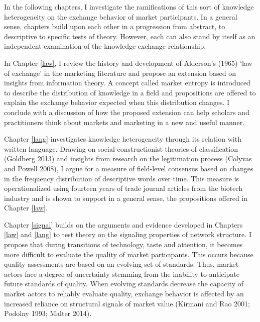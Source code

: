 In the following chapters, I investigate the ramifications of this sort of knowledge heterogeneity on the exchange behavior of market participants. In a general sense, chapters build upon each other in a progression from abstract, to descriptive to specific tests of theory. However, each can also stand by itself as an independent examination of the knowledge-exchange relationship. 

In Chapter \ref{law}, I review the history and development of Alderson's (1965) `law of exchange' in the marketing literature and propose an extension based on insights from information theory. A concept called market entropy is introduced to describe the distribution of knowledge in a field and propositions are offered to explain the exchange behavior expected when this distribution changes. I conclude with a discussion of how the proposed extension can help scholars and practitioners think about markets and marketing in a new and useful manner. 

Chapter \ref{lang} investigates knowledge heterogeneity through its relation with written language. Drawing on social-constructionist theories of classification (Goldberg 2013) and insights from research on the legitimation process (Colyvas and Powell 2008), I argue for a measure of field-level consensus based on changes in the frequency distribution of descriptive words over time. This measure is operationalized using fourteen years of trade journal articles from the biotech industry and is shown to support in a general sense, the propositions offered in Chapter \ref{law}. 

Chapter \ref{signal} builds on the arguments and evidence developed in Chapters \ref{law} and \ref{lang} to test theory on the signaling properties of network structure. I propose that during transitions of technology, taste and attention, it becomes more difficult to evaluate the quality of market participants. This occurs because quality assessments are based on an evolving set of standards. Thus, market actors face a degree of uncertainty stemming from the inability to anticipate future standards of quality. When evolving standards decrease the capacity of market actors to reliably evaluate quality, exchange behavior is affected by an increased reliance on structural signals of market value (Kirmani and Rao 2001; Podolny 1993; Malter 2014). 

